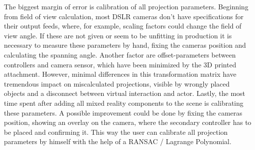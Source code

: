 The biggest margin of error is calibration of all projection parameters.
\newline
Beginning from field of view calculation, most DSLR cameras don't have 
specifications for their output feeds, where, for example, scaling factors 
could change the field of view angle. If these are not given or seem to be 
unfitting in production it is necessary to measure these parameters by hand, 
fixing the cameras position and calculating the spanning angle.
Another factor are offset-parameters between controllers and camera sensor, 
which have been minimized by the 3D printed attachment. However, minimal 
differences in this transformation matrix have tremendous impact on 
miscalculated projections, visible by wrongly placed objects and a disconnect 
between virtual interaction and actor.
Lastly, the most time spent after adding all mixed reality components to the 
scene is calibrating these parameters. A possible improvement could be done by 
fixing the cameras position, showing an overlay on the camera, where the 
secondary controller has to be placed and confirming it. This way the user can 
calibrate all projection parameters by himself with the help of a RANSAC / 
Lagrange Polynomial.
